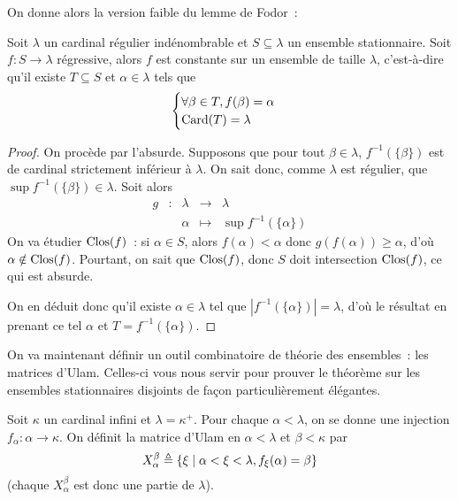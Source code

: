 On donne alors la version faible du lemme de Fodor~:

\begin{lemma}
  Soit $\lambda$ un cardinal régulier indénombrable et $S\subseteq \lambda$ un
  ensemble stationnaire. Soit $f : S \to \lambda$ régressive, alors $f$ est
  constante sur un ensemble de taille $\lambda$, c'est-à-dire qu'il existe
  $T\subseteq S$ et $\alpha \in \lambda$ tels que
  \[\begin{cases}
  \forall \beta \in T, f(\beta) = \alpha\\
  \operatorname{Card}(T) = \lambda
  \end{cases}\]
\end{lemma}

\begin{proof}
  On procède par l'absurde. Supposons que pour tout $\beta \in \lambda$,
  $f^{-1}(\{\beta\})$ est de cardinal strictement inférieur à $\lambda$. On sait
  donc, comme $\lambda$ est régulier, que $\sup f^{-1}(\{\beta\})\in \lambda$.
  Soit alors
  \[\begin{array}{ccccc}
  g & : & \lambda & \longrightarrow & \lambda\\
  & & \alpha & \longmapsto & \sup f^{-1}(\{\alpha\})
  \end{array}\]
  On va étudier $\operatorname{Clos}(f)$~: si $\alpha \in S$, alors $f(\alpha) < \alpha$ donc
  $g(f(\alpha)) \geq \alpha$, d'où $\alpha \notin \operatorname{Clos}(f)$. Pourtant, on sait
  que $\operatorname{Clos}(f)$, donc $S$ doit intersection $\operatorname{Clos}(f)$, ce qui est absurde.

  On en déduit donc qu'il existe $\alpha \in \lambda$ tel que
  $|f^{-1}(\{\alpha\})| = \lambda$, d'où le résultat en prenant ce tel $\alpha$
  et $T = f^{-1}(\{\alpha\})$.
\end{proof}

On va maintenant définir un outil combinatoire de théorie des ensembles~: les
matrices d'Ulam. Celles-ci vous nous servir pour prouver le théorème sur les
ensembles stationnaires disjoints de façon particulièrement élégantes.

\begin{definition}
  Soit $\kappa$ un cardinal infini et $\lambda = \kappa^+$. Pour chaque
  $\alpha < \lambda$, on se donne une injection $f_\alpha : \alpha \to\kappa$.
  On définit la matrice d'Ulam en $\alpha < \lambda$ et $\beta < \kappa$ par
  \[X_\alpha^\beta \triangleq
  \{\xi \mid \alpha < \xi < \lambda, f_\xi(\alpha) = \beta\}\]
  (chaque $X_\alpha^\beta$ est donc une partie de $\lambda$).
\end{definition}

